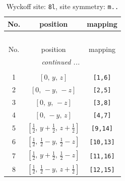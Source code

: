 \documentclass[fleqn,8pt]{jsarticle}
\begin{document}
\begin{longtable}{ccc}
\caption{Wyckoff site: {\tt 8l}, site symmetry: {\tt m..}}
 \\
 \hline \hline
No. & position & mapping \\ \hline \endfirsthead

\multicolumn{2}{l}{\tablename\ \thetable{}} \\
 \hline \hline
No. & position & mapping \\ \hline \endhead

 \hline \hline
\multicolumn{2}{r}{\footnotesize\it continued ...} \\ \endfoot

 \hline \hline
\multicolumn{2}{r}{} \\ \endlastfoot

1 & $\left[ 0,\, y,\, z \right]$ & {\tt [1,6]} \\ \hline
2 & $\left[ 0,\, - y,\, - z \right]$ & {\tt [2,5]} \\ \hline
3 & $\left[ 0,\, y,\, - z \right]$ & {\tt [3,8]} \\ \hline
4 & $\left[ 0,\, - y,\, z \right]$ & {\tt [4,7]} \\ \hline
5 & $\left[ \frac{1}{2},\, y + \frac{1}{2},\, z + \frac{1}{2} \right]$ & {\tt [9,14]} \\ \hline
6 & $\left[ \frac{1}{2},\, \frac{1}{2} - y,\, \frac{1}{2} - z \right]$ & {\tt [10,13]} \\ \hline
7 & $\left[ \frac{1}{2},\, y + \frac{1}{2},\, \frac{1}{2} - z \right]$ & {\tt [11,16]} \\ \hline
8 & $\left[ \frac{1}{2},\, \frac{1}{2} - y,\, z + \frac{1}{2} \right]$ & {\tt [12,15]} \\
\end{longtable}
\renewcommand{\arraystretch}{1.2}
\end{document}
